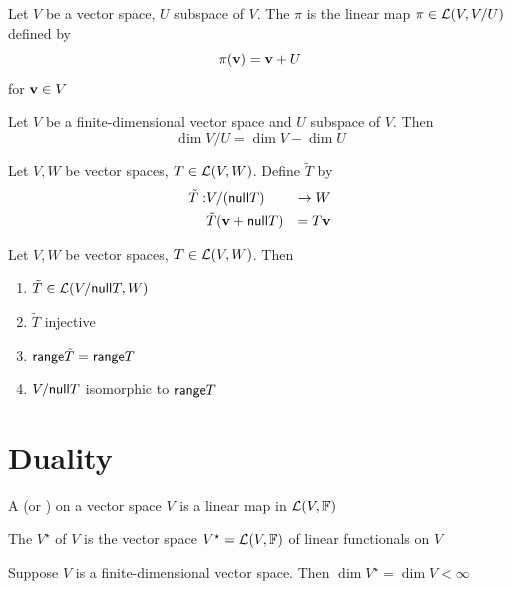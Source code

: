\documentclass[aspectratio=169]{beamer}
\begin{document}
\begin{frame}
\begin{definition}
Let $V$ be a vector space, $U$ subspace of $V$. The  $\pi$ is the linear map $\pi\in\mathcal{L}(V,V/U)$ defined by
\[
\pi(\mathbf{v})=\mathbf{v}+U
\]
for $\mathbf{v}\in V$
\end{definition}
\vfill
\begin{importanttheorem}
Let $V$ be a finite-dimensional vector space and $U$ subspace of $V$. Then
\[
\dim V/U=\dim V-\dim U
\]
\end{importanttheorem}
\end{frame}


\begin{frame}
\begin{definition}[$\tilde T$]
Let $V,W$ be vector spaces, $T\in\mathcal{L}(V,W)$. Define $\tilde T$ by
\begin{eqnarray*}
\tilde{T}: & V/(\mathsf{null} T) &\to W \\
& \tilde{T}(\mathbf{v}+\mathsf{null} T) &= T\mathbf{v}
\end{eqnarray*}
\end{definition}
\vfill
\begin{importanttheorem}
Let $V,W$ be vector spaces, $T\in\mathcal{L}(V,W)$. Then
\begin{enumerate}
\item $\tilde T\in\mathcal{L}(V/\mathsf{null} T,W)$
\item $\tilde T$ injective
\item $\mathsf{range} \tilde T=\mathsf{range} T$
\item $V/\mathsf{null} T$ isomorphic to $\mathsf{range} T$
\end{enumerate}
\end{importanttheorem}
\end{frame}


\section{Duality}

\begin{frame}
\begin{definition}
A  (or ) on a vector space $V$ is a linear map in $\mathcal{L}(V,\mathbb{F})$
\end{definition}
\vfill
\begin{definition}
The  $V^\star$ of $V$ is the vector space $V^\star=\mathcal{L}(V,\mathbb{F})$ of linear functionals on $V$
\end{definition}
\vfill
\begin{theorem}[$\dim V^\star=\dim V$]
Suppose $V$ is a finite-dimensional vector space. Then $\dim V^\star=\dim V<\infty$
\end{theorem}
\end{frame}
\end{document}
